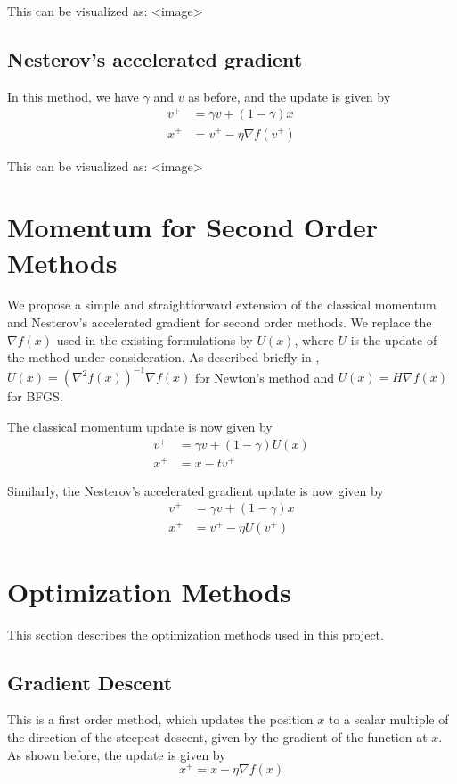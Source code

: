 \documentclass{article}
\begin{document}
This can be visualized as:
<image>

\subsection{Nesterov's accelerated gradient}
In this method, we have $\gamma$ and $v$ as before, and the update is given by
\begin{align}
v^+ &= \gamma v + (1-\gamma)x \\
x^+ &= v^+ - \eta \nabla f(v^+)
\end{align}

This can be visualized as:
<image>

\section{Momentum for Second Order Methods}\label{methodology}

We propose a simple and straightforward extension of the classical momentum and Nesterov's accelerated gradient for second order methods. We replace the $\nabla f(x)$ used in the existing formulations by $U(x)$, where $U$ is the update of the method under consideration. As described briefly in \label{opt}, $U(x)=\left(\nabla^2 f(x) \right)^{-1}\nabla f(x)$ for Newton's method and $U(x)=H \nabla f(x)$ for BFGS.

The classical momentum update is now given by
\begin{align*}
v^{+} &= \gamma v + (1-\gamma) U(x) \\
x^{+} &= x - tv^{+}
\end{align*}

Similarly, the Nesterov's accelerated gradient update is now given by
\begin{align}
v^+ &= \gamma v + (1-\gamma)x \\
x^+ &= v^+ - \eta U(v^+)
\end{align}

\section{Optimization Methods}\label{opt}
This section describes the optimization methods used in this project.

\subsection{Gradient Descent}
This is a first order method, which updates the position $x$ to a scalar multiple of the direction of the steepest descent, given by the gradient of the function at $x$. As shown before, the update is given by
\begin{equation}
x^+ = x - \eta \nabla f(x)
\end{equation}
\end{document}
